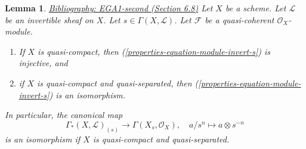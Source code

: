 \documentclass{amsart}
\newenvironment{reference}{\comment}{\endcomment}
\theoremstyle{plain}
\newtheorem{lemma}[subsection]{Lemma}
\theoremstyle{definition}
\theoremstyle{remark}
\numberwithin{equation}{subsection}
\begin{document}
\begin{lemma}
\label{properties-lemma-invert-s-sections}
\begin{reference}
\href{https://stacks.math.columbia.edu/bibliography}{Bibliography: EGA1-second (Section 6.8)}
\end{reference}
Let $X$ be a scheme. Let $\mathcal{L}$ be an invertible sheaf on $X$.
Let $s \in \Gamma(X, \mathcal{L})$. Let $\mathcal{F}$ be a quasi-coherent
$\mathcal{O}_X$-module.
\begin{enumerate}
\item If $X$ is quasi-compact, then (\ref{properties-equation-module-invert-s})
is injective, and
\item if $X$ is quasi-compact and quasi-separated, then
(\ref{properties-equation-module-invert-s}) is an isomorphism.
\end{enumerate}
In particular, the canonical map
$$
\Gamma_*(X, \mathcal{L})_{(s)}
\longrightarrow
\Gamma(X_s, \mathcal{O}_X),\quad
a/s^n \longmapsto a \otimes s^{-n}
$$
is an isomorphism if $X$ is quasi-compact and quasi-separated.
\end{lemma}
\end{document}

